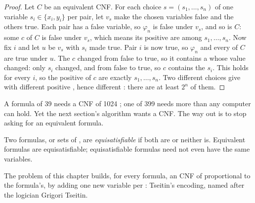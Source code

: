 \begin{proof}
Let $C$ be an equivalent CNF. For each choice $s = (s_1, \dots, s_n)$ of one variable $s_i \in \{x_i, y_i\}$ per pair,
let $v_s$ make the chosen variables false and the others true. Each pair has a false variable, so $\varphi_n$ is false
under $v_s$, and so is $C$: some  $c$ of $C$ is false under $v_s$, which means its positive  are
among $s_1, \dots, s_n$. Now fix $i$ and let $u$ be $v_s$ with $s_i$ made true. Pair $i$ is now true, so $\varphi_n$ and
every  of $C$ are true under $u$. The  $c$ changed from false to true, so it contains a  whose value
changed: only $s_i$ changed, and from false to true, so $c$ contains the  $s_i$. This holds for every $i$, so
the positive  of $c$ are exactly $s_1, \dots, s_n$. Two different choices give  with different positive
, hence different : there are at least $2^n$ of them.
\end{proof}

A formula of  39 needs a CNF of 1024 ; one of  399 needs more  than any computer can hold. Yet
the next section's algorithm wants a CNF. The way out is to stop asking for an equivalent formula.

\begin{definition}\label{def:b1:propositional-logic:equisat}
Two formulas, or sets of , are \emph{equisatisfiable} if both are 
or neither is. Equivalent formulas are equisatisfiable; equisatisfiable formulas need not even have the same
variables.
\end{definition}

The problem of this chapter builds, for every formula, an  CNF of  proportional to the formula's, by
adding one new variable per : Tseitin's encoding, named after the logician Grigori Tseitin.

